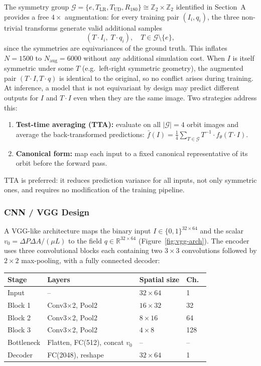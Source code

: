 \documentclass[conference,compsoc]{IEEEtran}
\begin{document}
The symmetry group $\mathcal{G}=\{e,T_\mathrm{LR},T_\mathrm{UD},R_{180}\}\cong\mathbb{Z}_2\times\mathbb{Z}_2$ identified in Section~A provides a free $4\times$ augmentation: for every training pair $(I_i, q_i)$, the three non-trivial transforms generate valid additional samples
\begin{equation}
  (T\cdot I_i,\; T\cdot q_i), \quad T\in\mathcal{G}\setminus\{e\},
  \label{eq:augmentation}
\end{equation}
since the symmetries are equivariances of the ground truth. This inflates $N=1500$ to $N_\mathrm{aug}=6000$ without any additional simulation cost. When $I$ is itself symmetric under some $T$ (e.g.\ left-right symmetric geometry), the augmented pair $(T\cdot I, T\cdot q)$ is identical to the original, so no conflict arises during training. At inference, a model that is not equivariant by design may predict different outputs for $I$ and $T\cdot I$ even when they are the same image. Two strategies address this:
\begin{enumerate}[noitemsep,topsep=0pt]
  \item \textbf{Test-time averaging (TTA):} evaluate on all $|\mathcal{G}|=4$ orbit images and average the back-transformed predictions:
    $\bar{f}(I) = \frac{1}{4}\sum_{T\in\mathcal{G}} T^{-1}\cdot f_\theta(T\cdot I)$.
  \item \textbf{Canonical form:} map each input to a fixed canonical representative of its orbit before the forward pass.
\end{enumerate}
TTA is preferred: it reduces prediction variance for all inputs, not only symmetric ones, and requires no modification of the training pipeline.

\subsubsection{CNN / VGG Design}

A VGG-like architecture maps the binary input $I\in\{0,1\}^{32\times64}$ and the scalar $v_0 = \Delta P\Delta A/(\mu L)$ to the field $q\in\mathbb{R}^{32\times64}$ (Figure~\ref{fig:vgg-arch}). The encoder uses three convolutional blocks each containing two $3\times3$ convolutions followed by $2\times2$ max-pooling, with a fully connected decoder:

\begin{center}
\small
\begin{tabular}{@{}llll@{}}
\toprule
Stage & Layers & Spatial size & Ch.\ \\
\midrule
Input    & --               & $32\times64$ & 1   \\
Block 1  & Conv3$\times$2, Pool2 & $16\times32$ & 32  \\
Block 2  & Conv3$\times$2, Pool2 & $8\times16$  & 64  \\
Block 3  & Conv3$\times$2, Pool2 & $4\times8$   & 128 \\
Bottleneck & Flatten, FC(512), concat $v_0$ & -- & -- \\
Decoder  & FC(2048), reshape & $32\times64$ & 1   \\
\bottomrule
\end{tabular}
\end{center}
\end{document}
